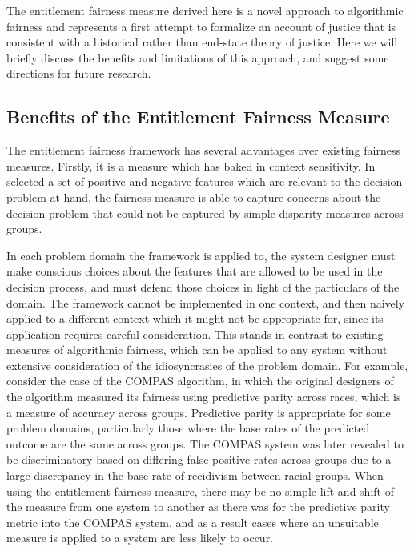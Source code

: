 The entitlement fairness measure derived here is a novel approach to algorithmic
fairness and represents a first attempt to formalize an account of justice that
is consistent with a historical rather than end-state theory of justice. Here we
will briefly discuss the benefits and limitations of this approach, and suggest
some directions for future research.

\subsection{Benefits of the Entitlement Fairness Measure}

The entitlement fairness framework has several advantages over existing fairness
measures. Firstly, it is a measure which has baked in context sensitivity. In
selected a set of positive and negative features which are relevant to the
decision problem at hand, the fairness measure is able to capture concerns about
the decision problem that could not be captured by simple disparity measures
across groups. 

In each problem domain the framework is applied to, the system designer must
make conscious choices about the features that are allowed to be used in the 
decision process, and must defend those choices in light of the particulars of
the domain. The framework cannot be implemented in one context, and then naively
applied to a different context which it might not be appropriate for, since its
application requires careful consideration. This stands in contrast
to existing measures of algorithmic fairness, which can be applied to any system
without extensive consideration of the idiosyncrasies of the problem domain. For
example, consider the case of the COMPAS algorithm, in which the original
designers of the algorithm measured its fairness using predictive parity across
races, which is a measure of accuracy across groups. Predictive parity is
appropriate for some problem domains, particularly those where the base rates of
the predicted outcome are the same across groups. The COMPAS system was later
revealed to be discriminatory based on differing false positive rates across 
groups due to a large discrepancy in the base rate of recidivism between racial
groups. When using the entitlement fairness measure, there may be no simple lift
and shift of the measure from one system to another as there was for the
predictive parity metric into the COMPAS system, and as a result cases where an
unsuitable measure is applied to a system are less likely to occur.

